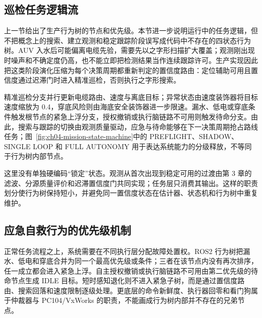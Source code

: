 \subsection{巡检任务逻辑流}\label{sec:ch04-4-2-2}

上一节给出了生产行为树的节点和优先级。本节进一步说明运行中的任务逻辑，但不把概念上的搜索、建立观测和稳定跟踪阶段误写成代码中不存在的四状态行为树。AUV 入水后可能偏离电缆先验，需要先以之字形扫描扩大覆盖；观测刚出现时噪声和不确定度仍高，也不能立即把检测结果当作连续跟踪许可。生产实现因此把这类阶段演化压缩为每个决策周期都重新判定的置信度路由：定位辅助可用且置信度通过迟滞门时进入精准巡检，否则执行之字形搜索。

精准巡检分支并行更新电缆路由、速度与离底目标；异常状态由速度装饰器将目标速度缩放为 0.4，穿底风险则由海底安全装饰器进一步限速。漏水、低电或穿底条件触发根节点的紧急上浮分支，授权撤销或执行脑链路不可用则触发待命分支。由此，搜索与跟踪的切换由观测质量驱动，应急与待命能够在下一决策周期抢占路线任务；图~\ref{fig:ch04-mission-state-machine}中的 PREFLIGHT、SHADOW、SINGLE LOOP 和 FULL AUTONOMY 用于表达系统能力的分级释放，不等同于行为树内部节点。

这里没有单独硬编码``锁定''状态。观测从首次出现到稳定可用的过渡由第 3 章的滤波、分源质量评价和迟滞置信度门共同实现；任务层只消费其输出。这样的职责划分使行为树保持短小，并避免同一置信度状态在估计器、状态机和行为树中重复维护。

\subsection{应急自救行为的优先级机制}\label{sec:ch04-4-2-3}

正常任务流程之上，系统需要在不同执行层分配故障处置权。ROS2 行为树把漏水、低电和穿底合并为同一个最高优先级或条件；三者在该节点内没有再次排序，任一成立都会进入紧急上浮。自主授权撤销或执行脑链路不可用由第二优先级的待命节点生成 IDLE 目标。短时感知退化则不进入紧急子树，而是通过置信度路由、搜索回落和速度限制逐级处理。更底层的命令新鲜度、执行器回零和看门狗属于仲裁器与 PC104/VxWorks 的职责，不能画成行为树内部并不存在的兄弟节点。

